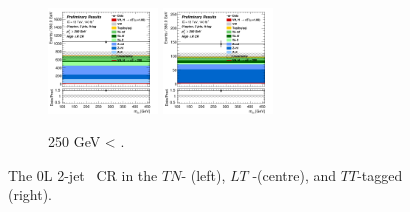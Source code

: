 \begin{figure}[h!]
\begin{subfigure}[b]{\textwidth}
        \includegraphics[width=0.32\textwidth]{Images/VH/Own_fit/prefit_VHcc/Region_distmBB_BMin250_DCRHigh_J2_TTypelt_T2_L0_Y6051_Prefit.png}
        \includegraphics[width=0.32\textwidth]{Images/VH/Own_fit/prefit_VHcc/Region_distmBB_BMin250_DCRHigh_J2_TTypett_T2_L0_Y6051_Prefit.png}
        \caption{250 GeV < \ptv.}
        \label{fig:plots_VHcc_OL_250_CRH_2c_2J}
    \end{subfigure}
    \caption{The 0L 2-jet \highdr\ CR in the $TN$- (left), $LT$ -(centre), and $TT$-tagged (right).}
    \label{fig:plots_VHcc_OL_CRH_2c_2J}
\end{figure} 
